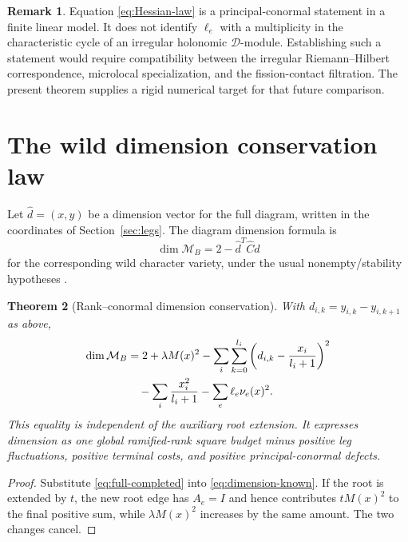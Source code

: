 \documentclass[11pt,a4paper]{amsart}
\theoremstyle{plain}
\newtheorem{theorem}{Theorem}[section]
\theoremstyle{definition}
\newtheorem{remark}[theorem]{Remark}
\newcommand{\Mcal}{\mathcal M}
\begin{document}
\begin{remark}
Equation \eqref{eq:Hessian-law} is a principal-conormal statement in a finite linear model.  It
does not identify $\ell_e$ with a multiplicity in the characteristic cycle of an irregular
holonomic $\mathcal D$-module.  Establishing such a statement would require compatibility between
the irregular Riemann--Hilbert correspondence, microlocal specialization, and the fission-contact
filtration.  The present theorem supplies a rigid numerical target for that future comparison.
\end{remark}

\section{The wild dimension conservation law}\label{sec:dimension}

Let $\widehat d=(x,y)$ be a dimension vector for the full diagram, written in the coordinates of
Section~\ref{sec:legs}.  The diagram dimension formula is
\begin{equation}\label{eq:dimension-known}
                \dim\Mcal_B=2-\widehat d^T\widehat C\widehat d
\end{equation}
for the corresponding wild character variety, under the usual nonempty/stability hypotheses
\cite{Doucot2021Diagrams}.

\begin{theorem}[Rank--conormal dimension conservation]\label{thm:dimension-law}
With $d_{i,k}=y_{i,k}-y_{i,k+1}$ as above,
\begin{align}\label{eq:dimension-law}
 \dim\Mcal_B
 &=2+\lambda M(x)^2
 -\sum_i\sum_{k=0}^{l_i}
     \left(d_{i,k}-\frac{x_i}{l_i+1}\right)^2\notag\\
 &\quad-\sum_i\frac{x_i^2}{l_i+1}
 -\sum_e\ell_e\nu_e(x)^2.
\end{align}
This equality is independent of the auxiliary root extension.  It expresses dimension as one
global ramified-rank square budget minus positive leg fluctuations, positive terminal costs, and
positive principal-conormal defects.
\end{theorem}

\begin{proof}
Substitute \eqref{eq:full-completed} into \eqref{eq:dimension-known}.  If the root is extended by
$t$, the new root edge has $A_e=I$ and hence contributes $tM(x)^2$ to the final positive sum, while
$\lambda M(x)^2$ increases by the same amount.  The two changes cancel.
\end{proof}
\end{document}
